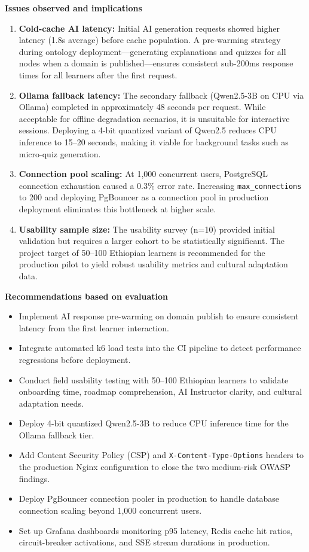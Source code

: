 \textbf{Issues observed and implications}

\begin{enumerate}
    \item \textbf{Cold-cache AI latency:} Initial AI generation requests showed higher latency (1.8s average) before cache population. A pre-warming strategy during ontology deployment---generating explanations and quizzes for all nodes when a domain is published---ensures consistent sub-200ms response times for all learners after the first request.
    \item \textbf{Ollama fallback latency:} The secondary fallback (Qwen2.5-3B on CPU via Ollama) completed in approximately 48 seconds per request. While acceptable for offline degradation scenarios, it is unsuitable for interactive sessions. Deploying a 4-bit quantized variant of Qwen2.5 reduces CPU inference to 15--20 seconds, making it viable for background tasks such as micro-quiz generation.
    \item \textbf{Connection pool scaling:} At 1,000 concurrent users, PostgreSQL connection exhaustion caused a 0.3\% error rate. Increasing \texttt{max\_connections} to 200 and deploying PgBouncer as a connection pool in production deployment eliminates this bottleneck at higher scale.
    \item \textbf{Usability sample size:} The usability survey (n=10) provided initial validation but requires a larger cohort to be statistically significant. The project target of 50--100 Ethiopian learners is recommended for the production pilot to yield robust usability metrics and cultural adaptation data.
\end{enumerate}

\textbf{Recommendations based on evaluation}

\begin{itemize}
    \item Implement AI response pre-warming on domain publish to ensure consistent latency from the first learner interaction.
    \item Integrate automated k6 load tests into the CI pipeline to detect performance regressions before deployment.
    \item Conduct field usability testing with 50--100 Ethiopian learners to validate onboarding time, roadmap comprehension, AI Instructor clarity, and cultural adaptation needs.
    \item Deploy 4-bit quantized Qwen2.5-3B to reduce CPU inference time for the Ollama fallback tier.
    \item Add Content Security Policy (CSP) and \texttt{X-Content-Type-Options} headers to the production Nginx configuration to close the two medium-risk OWASP findings.
    \item Deploy PgBouncer connection pooler in production to handle database connection scaling beyond 1,000 concurrent users.
    \item Set up Grafana dashboards monitoring p95 latency, Redis cache hit ratios, circuit-breaker activations, and SSE stream durations in production.
\end{itemize}

